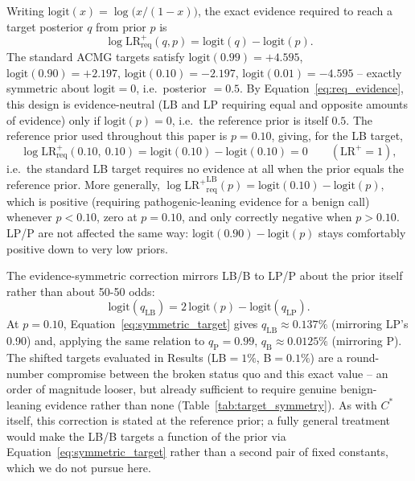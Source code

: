 \documentclass[11pt]{article}
\newcommand{\lrp}{\mathrm{LR}^{+}}
\begin{document}
Writing $\mathrm{logit}(x) = \log\bigl(x/(1-x)\bigr)$, the exact evidence
required to reach a target posterior $q$ from prior $p$ is
\begin{equation}
  \log\lrp_{\mathrm{req}}(q, p) = \mathrm{logit}(q) - \mathrm{logit}(p).
  \label{eq:req_evidence}
\end{equation}
The standard ACMG targets satisfy
$\mathrm{logit}(0.99) = +4.595$,
$\mathrm{logit}(0.90) = +2.197$,
$\mathrm{logit}(0.10) = -2.197$,
$\mathrm{logit}(0.01) = -4.595$ -- exactly symmetric about
$\mathrm{logit}=0$, i.e.\ posterior $=0.5$. By Equation~\ref{eq:req_evidence},
this design is evidence-neutral (LB and LP requiring equal and opposite
amounts of evidence) only if $\mathrm{logit}(p)=0$, i.e.\ the reference
prior is itself $0.5$. The reference prior used throughout this paper is
$p=0.10$, giving, for the LB target,
\begin{equation}
  \log\lrp_{\mathrm{req}}(0.10,\ 0.10) = \mathrm{logit}(0.10) - \mathrm{logit}(0.10) = 0
  \qquad(\lrp = 1),
  \label{eq:lb_degenerate}
\end{equation}
i.e.\ the standard LB target requires no evidence at all when the prior
equals the reference prior. More generally,
$\log{\lrp}_{\mathrm{req}}^{\mathrm{LB}}(p) = \mathrm{logit}(0.10) - \mathrm{logit}(p)$,
which is positive (requiring pathogenic-leaning evidence for a benign call)
whenever $p<0.10$, zero at $p=0.10$, and only correctly negative when
$p>0.10$. LP/P are not affected the same way:
$\mathrm{logit}(0.90) - \mathrm{logit}(p)$ stays comfortably positive down
to very low priors.

The evidence-symmetric correction mirrors LB/B to LP/P about the prior
itself rather than about 50-50 odds:
\begin{equation}
  \mathrm{logit}(q_{\mathrm{LB}}) = 2\,\mathrm{logit}(p) - \mathrm{logit}(q_{\mathrm{LP}}).
  \label{eq:symmetric_target}
\end{equation}
At $p=0.10$, Equation~\ref{eq:symmetric_target} gives
$q_{\mathrm{LB}} \approx 0.137\%$ (mirroring LP's 0.90) and, applying the
same relation to $q_{\mathrm{P}}=0.99$, $q_{\mathrm{B}} \approx 0.0125\%$
(mirroring P). The shifted targets evaluated in Results (LB$=1\%$,
B$=0.1\%$) are a round-number compromise between the broken status quo and
this exact value -- an order of magnitude looser, but already sufficient to
require genuine benign-leaning evidence rather than none
(Table~\ref{tab:target_symmetry}). As with $C^*$ itself, this correction is
stated at the reference prior; a fully general treatment would make the
LB/B targets a function of the prior via Equation~\ref{eq:symmetric_target}
rather than a second pair of fixed constants, which we do not pursue here.
\end{document}

